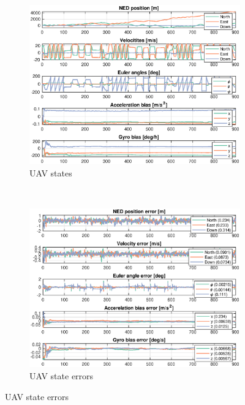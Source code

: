 \begin{figure}[ht]
    \centering
	\begin{subfigure}[b]{0.45\textwidth}
		\includegraphics[width=\textwidth]{figures/ga_2/sim_state}
		\caption{UAV states}
		\label{fig:ga_2_sim_state}
	\end{subfigure}%
       ~
	\begin{subfigure}[b]{0.45\textwidth}
		\includegraphics[width=\textwidth]{figures/ga_2/sim_errors}
		\caption{UAV state errors}
		\label{fig:ga_2_sim_errors}
	\end{subfigure}
    \label{fig:ga_2_sim_state_errors} 
\end{figure}

